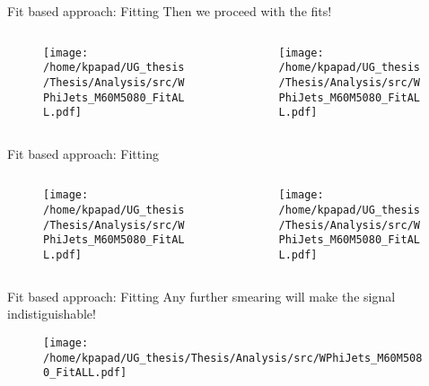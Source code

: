 \documentclass[bigger]{beamer}
\begin{document}
\begin{frame}[label={sec:orge51f8f7}]{Fit based approach: Fitting}
Then we proceed with the fits!
\begin{columns}
\begin{column}{0.5\columnwidth}
\begin{figure}[h]
\centering
\texttt{[image: /home/kpapad/UG\_thesis/Thesis/Analysis/src/WPhiJets\_M60M5080\_FitALL.pdf]}
\end{figure}
\end{column}

\begin{column}{0.5\columnwidth}
\begin{figure}[h]
\centering
\texttt{[image: /home/kpapad/UG\_thesis/Thesis/Analysis/src/WPhiJets\_M60M5080\_FitALL.pdf]}
\end{figure}
\end{column}
\end{columns}
\end{frame}

\begin{frame}[label={sec:org3bad91e}]{Fit based approach: Fitting}
\begin{columns}
\begin{column}{0.5\columnwidth}
\begin{figure}[h]
\centering
\texttt{[image: /home/kpapad/UG\_thesis/Thesis/Analysis/src/WPhiJets\_M60M5080\_FitALL.pdf]}
\end{figure}
\end{column}

\begin{column}{0.5\columnwidth}
\begin{figure}[h]
\centering
\texttt{[image: /home/kpapad/UG\_thesis/Thesis/Analysis/src/WPhiJets\_M60M5080\_FitALL.pdf]}
\end{figure}
\end{column}
\end{columns}
\end{frame}

\begin{frame}[label={sec:org8376b3c}]{Fit based approach: Fitting}
Any further smearing will make the signal indistiguishable!
\begin{figure}[h]
\centering
\texttt{[image: /home/kpapad/UG\_thesis/Thesis/Analysis/src/WPhiJets\_M60M5080\_FitALL.pdf]}
\end{figure}
\end{frame}
\end{document}
